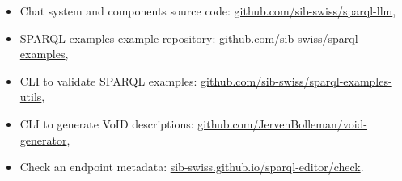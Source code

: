 \documentclass[
]{ceurart}
\begin{document}
\begin{itemize}
\item Chat system and components source code: \href{https://github.com/sib-swiss/sparql-llm}{github.com/sib-swiss/sparql-llm},
\item
  SPARQL examples example repository: \href{https://github.com/sib-swiss/sparql-examples}{github.com/sib-swiss/sparql-examples},
\item
  CLI to validate SPARQL examples: \href{https://github.com/sib-swiss/sparql-examples-utils}{github.com/sib-swiss/sparql-examples-utils},
\item
  CLI to generate VoID descriptions: \href{https://github.com/JervenBolleman/void-generator}{github.com/JervenBolleman/void-generator},
\item
  Check an endpoint metadata: \href{https://sib-swiss.github.io/sparql-editor/check}{sib-swiss.github.io/sparql-editor/check}.
\end{itemize}
\end{document}
